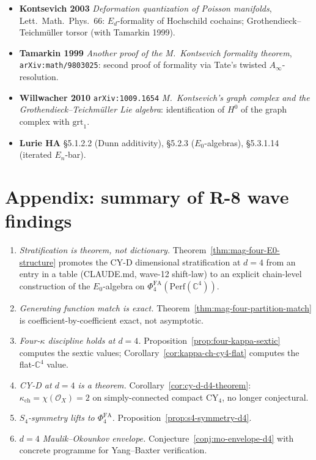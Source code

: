 \documentclass[11pt]{article}
\providecommand{\C}{\mathbb{C}}
\providecommand{\R}{\mathbb{R}}
\providecommand{\cO}{\mathcal{O}}
\providecommand{\Perf}{\mathrm{Perf}}
\providecommand{\Ezero}{E_0}
\providecommand{\PhiFA}{\Phi^{\mathrm{FA}}}
\theoremstyle{definition}
\begin{document}
\begin{itemize}[leftmargin=2em]
  \emph{Factorization algebras in quantum field theory}: factorisation
  algebras on $\R^n$; holomorphic-factorisation locality; $\Ezero$-collapse
  at compact CY$_d$ (Corollary~5.4.6).
  \item \textbf{Kontsevich 2003} \emph{Deformation quantization of
  Poisson manifolds}, Lett.\ Math.\ Phys.\ 66: $E_d$-formality
  of Hochschild cochains; Grothendieck--Teichm\"uller torsor
  (with Tamarkin 1999).
  \item \textbf{Tamarkin 1999} \emph{Another proof of the
  M.~Kontsevich formality theorem}, \texttt{arXiv:math/9803025}:
  second proof of formality via Tate's twisted $A_\infty$-resolution.
  \item \textbf{Willwacher 2010} \texttt{arXiv:1009.1654}
  \emph{M.~Kontsevich's graph complex and the Grothendieck--Teichm\"uller
  Lie algebra}: identification of $H^0$ of the graph complex with
  $\mathrm{grt}_1$.
  \item \textbf{Lurie HA} \S 5.1.2.2 (Dunn additivity), \S 5.2.3
  ($\Ezero$-algebras), \S 5.3.1.14 (iterated $E_n$-bar).
\end{itemize}

\section{Appendix: summary of R-8 wave findings}
\label{sec:R8-summary}

\begin{enumerate}[label=F\arabic*.]
  \item \emph{Stratification is theorem, not dictionary.}
  Theorem~\ref{thm:mag-four-E0-structure} promotes the CY-D
  dimensional stratification at $d = 4$ from an entry in a table
  (CLAUDE.md, wave-12 shift-law) to an explicit chain-level construction
  of the $\Ezero$-algebra on $\PhiFA_4(\Perf(\C^4))$.
  \item \emph{Generating function match is exact.}
  Theorem~\ref{thm:mag-four-partition-match} is coefficient-by-coefficient
  exact, not asymptotic.
  \item \emph{Four-$\kappa$ discipline holds at $d = 4$.}
  Proposition~\ref{prop:four-kappa-sextic} computes the sextic values;
  Corollary~\ref{cor:kappa-ch-cy4-flat} computes the flat-$\C^4$ value.
  \item \emph{CY-D at $d = 4$ is a theorem.}
  Corollary~\ref{cor:cy-d-d4-theorem}:
  $\kappa_{\mathrm{ch}} = \chi(\cO_X) = 2$ on simply-connected compact
  CY$_4$, no longer conjectural.
  \item \emph{$S_4$-symmetry lifts to $\PhiFA_4$.}
  Proposition~\ref{prop:s4-symmetry-d4}.
  \item \emph{$d = 4$ Maulik--Okounkov envelope.}
  Conjecture~\ref{conj:mo-envelope-d4} with concrete programme for
  Yang--Baxter verification.
\end{enumerate}
\end{document}
